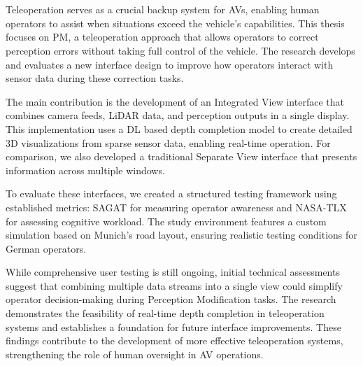 \chapter{\abstractname}


    Teleoperation serves as a crucial backup system for \acp{AV}, enabling human operators to assist when situations exceed the vehicle's capabilities. This thesis focuses on \ac{PM}, a teleoperation approach that allows operators to correct perception errors without taking full control of the vehicle. The research develops and evaluates a new interface design to improve how operators interact with sensor data during these correction tasks.

    The main contribution is the development of an Integrated View interface that combines camera feeds, LiDAR data, and perception outputs in a single display. This implementation uses a \ac{DL} based depth completion model to create detailed 3D visualizations from sparse sensor data, enabling real-time operation. For comparison, we also developed a traditional Separate View interface that presents information across multiple windows.

    To evaluate these interfaces, we created a structured testing framework using established metrics: \ac{SAGAT} for measuring operator awareness and \ac{NASA-TLX} for assessing cognitive workload. The study environment features a custom simulation based on Munich's road layout, ensuring realistic testing conditions for German operators.

While comprehensive user testing is still ongoing, initial technical assessments suggest that combining multiple data streams into a single view could simplify operator decision-making during Perception Modification tasks. The research demonstrates the feasibility of real-time depth completion in teleoperation systems and establishes a foundation for future interface improvements. These findings contribute to the development of more effective teleoperation systems, strengthening the role of human oversight in \ac{AV} operations.
